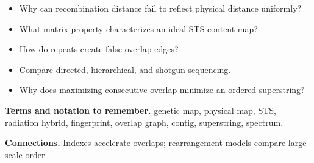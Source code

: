 \documentclass[11pt]{article}
\begin{document}
\begin{tcolorbox}[enhanced,breakable,title={Self-test questions},
  colback=white,colframe=Accent,fonttitle=\small\sffamily\bfseries,fontupper=\footnotesize,
  boxsep=0.6mm,left=1.5mm,right=1.5mm,top=1mm,bottom=1mm,before skip=3pt,after skip=3pt]
\begin{itemize}
  \item Why can recombination distance fail to reflect physical distance uniformly?
  \item What matrix property characterizes an ideal STS-content map?
  \item How do repeats create false overlap edges?
  \item Compare directed, hierarchical, and shotgun sequencing.
  \item Why does maximizing consecutive overlap minimize an ordered superstring?
\end{itemize}
\end{tcolorbox}

{\footnotesize
\textbf{Terms and notation to remember.} genetic map, physical map, STS, radiation hybrid, fingerprint, overlap graph, contig, superstring, spectrum.

\textbf{Connections.} Indexes accelerate overlaps; rearrangement models compare large-scale order.
}
\end{document}
